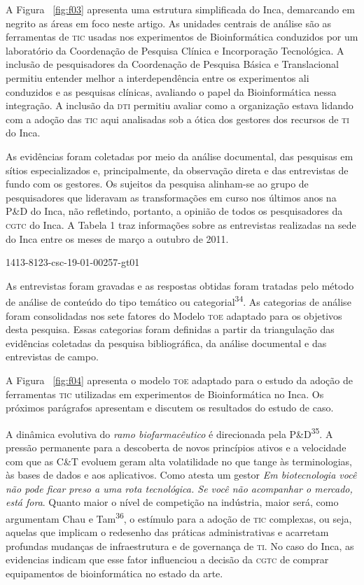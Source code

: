 \documentclass{article}
\begin{document}
A Figura ~\ref{fig:f03}
apresenta uma estrutura simplificada do Inca, demarcando em negrito as áreas em
foco neste artigo. As unidades centrais de análise são as ferramentas de \textsc{tic}
usadas nos experimentos de Bioinformática conduzidos por um laboratório da
Coordenação de Pesquisa Clínica e Incorporação Tecnológica. A inclusão de
pesquisadores da Coordenação de Pesquisa Básica e Translacional permitiu
entender melhor a interdependência entre os experimentos ali conduzidos e as
pesquisas clínicas, avaliando o papel da Bioinformática nessa integração. A
inclusão da \textsc{dti} permitiu avaliar como a organização estava lidando com a adoção
das \textsc{tic} aqui analisadas sob a ótica dos gestores dos recursos de \textsc{ti} do Inca.

As evidências foram coletadas por meio da análise documental, das pesquisas em
sítios especializados e, principalmente, da observação direta e das entrevistas
de fundo com os gestores. Os sujeitos da pesquisa alinham-se ao grupo de
pesquisadores que lideravam as transformações em curso nos últimos anos na P\&D
do Inca, não refletindo, portanto, a opinião de todos os pesquisadores da \textsc{cgtc}
do Inca. A Tabela 1 traz informações sobre as entrevistas realizadas na sede do
Inca entre os meses de março a outubro de 2011.

1413-8123-csc-19-01-00257-gt01

As entrevistas foram gravadas e as respostas obtidas foram tratadas pelo método
de análise de conteúdo do tipo temático ou categorial\textsuperscript{34}. As categorias de análise foram consolidadas nos sete fatores do Modelo \textsc{toe}
adaptado para os objetivos desta pesquisa. Essas categorias foram definidas a
partir da triangulação das evidências coletadas da pesquisa bibliográfica, da
análise documental e das entrevistas de campo.

A Figura ~\ref{fig:f04}
apresenta o modelo \textsc{toe} adaptado para o estudo da adoção de ferramentas \textsc{tic}
utilizadas em experimentos de Bioinformática no Inca. Os próximos parágrafos
apresentam e discutem os resultados do estudo de caso.

A dinâmica evolutiva do \textit{ramo biofarmacêutico}
é direcionada pela P\&D\textsuperscript{35}. A pressão permanente para a descoberta de novos princípios ativos e a
velocidade com que as C\&T evoluem geram alta volatilidade no que tange às
terminologias, às bases de dados e aos aplicativos. Como atesta um gestor
\textit{Em biotecnologia você não pode ficar preso a uma rota tecnológica. Se
você não acompanhar o mercado, está fora}. Quanto maior o nível de competição na indústria, maior será, como argumentam
Chau e Tam\textsuperscript{36}, o estímulo para a adoção de \textsc{tic} complexas, ou seja, aquelas que implicam o
redesenho das práticas administrativas e acarretam profundas mudanças de
infraestrutura e de governança de \textsc{ti}. No caso do Inca, as evidencias indicam que
esse fator influenciou a decisão da \textsc{cgtc} de comprar equipamentos de
bioinformática no estado da arte.
\end{document}

